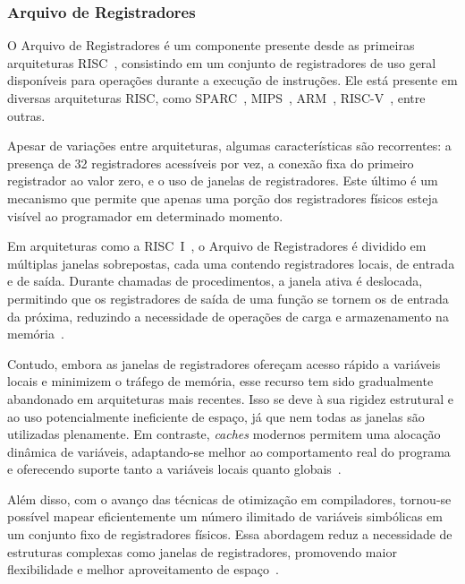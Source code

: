 \documentclass[
	12pt,				%
	openright,			%
	oneside,			%
	a4paper,			%
	english,			%
	french,				%
	spanish,			%
	brazil,				%
	]{abntex2}
\begin{document}
\subsubsection{Arquivo de Registradores}
O Arquivo de Registradores é um componente presente desde as primeiras arquiteturas RISC~\cite[p.7-10]{peek_vlsi_1983}, consistindo em um conjunto de registradores de uso geral disponíveis para operações durante a execução de instruções. Ele está presente em diversas arquiteturas RISC, como SPARC~\cite[p.25]{sparc_international_inc_sparc_1994}, MIPS~\cite[p.40-42]{mips_tech_llc_mips32_2016}, ARM~\cite{arm_arm_2014}, RISC-V~\cite[p.20-22]{risc-v_risc-v_2024}, entre outras.

Apesar de variações entre arquiteturas, algumas características são recorrentes: a presença de 32 registradores acessíveis por vez, a conexão fixa do primeiro registrador ao valor zero, e o uso de janelas de registradores. Este último é um mecanismo que permite que apenas uma porção dos registradores físicos esteja visível ao programador em determinado momento.

Em arquiteturas como a RISC~I~\cite[p.7-10]{peek_vlsi_1983}, o Arquivo de Registradores é dividido em múltiplas janelas sobrepostas, cada uma contendo registradores locais, de entrada e de saída. Durante chamadas de procedimentos, a janela ativa é deslocada, permitindo que os registradores de saída de uma função se tornem os de entrada da próxima, reduzindo a necessidade de operações de carga e armazenamento na memória~\cite{peek_vlsi_1983}.

Contudo, embora as janelas de registradores ofereçam acesso rápido a variáveis locais e minimizem o tráfego de memória, esse recurso tem sido gradualmente abandonado em arquiteturas mais recentes. Isso se deve à sua rigidez estrutural e ao uso potencialmente ineficiente de espaço, já que nem todas as janelas são utilizadas plenamente. Em contraste, \textit{caches} modernos permitem uma alocação dinâmica de variáveis, adaptando-se melhor ao comportamento real do programa e oferecendo suporte tanto a variáveis locais quanto globais~\cite[p.43-44]{stallings_reduced_1988}.

Além disso, com o avanço das técnicas de otimização em compiladores, tornou-se possível mapear eficientemente um número ilimitado de variáveis simbólicas em um conjunto fixo de registradores físicos. Essa abordagem reduz a necessidade de estruturas complexas como janelas de registradores, promovendo maior flexibilidade e melhor aproveitamento de espaço~\cite[p.44]{stallings_reduced_1988}.
\end{document}

